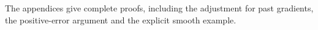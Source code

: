 The appendices give complete proofs, including the adjustment for past
gradients, the positive-error argument and the explicit smooth example.

\appendix








\FloatBarrier
\makeatletter
\protected@write{}
\makeatother

\begingroup
\renewcommand{\url}[1]{\href{#1}{Online source}}
\providecommand{\doi}[1]{\href{https://doi.org/#1}{\nolinkurl{https://doi.org/#1}}}
\def\urlprefix{}


\endgroup

